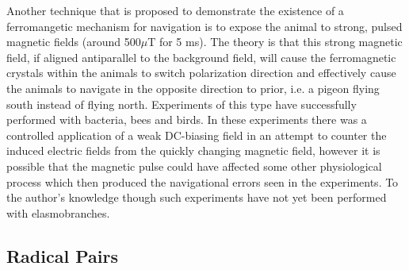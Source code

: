 \documentclass[12pt]{article}
\begin{document}
Another technique that is proposed to demonstrate the existence of a ferromangetic mechanism for navigation is to expose the animal to strong, pulsed magnetic fields (around 500$\mu$T for 5 ms\cite{Johnsen:2008}). The theory is that this strong magnetic field, if aligned antiparallel to the background field, will cause the ferromagnetic crystals within the animals to switch polarization direction and effectively cause the animals to navigate in the opposite direction to prior, i.e. a pigeon flying south instead of flying north. Experiments of this type have successfully performed with bacteria, bees and birds\cite{Kirschvink:2001}. In these experiments there was a controlled application of a weak DC-biasing field in an attempt to counter the induced electric fields from the quickly changing magnetic field\cite{Kirschvink:2001}, however it is possible that the magnetic pulse could have affected some other physiological process which then produced the navigational errors seen in the experiments\cite{Johnsen:2008}. To the author's knowledge though such experiments have not yet been performed with elasmobranches.

\subsection{Radical Pairs}
\end{document}
